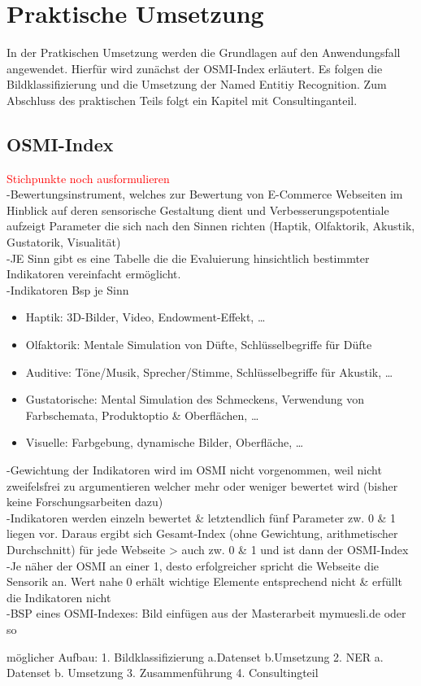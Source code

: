 \newpage
\section{Praktische Umsetzung} \label{latexDetails}

In der Pratkischen Umsetzung werden die Grundlagen auf den Anwendungsfall angewendet. Hierfür wird zunächst der OSMI-Index erläutert.
Es folgen die Bildklassifizierung und die Umsetzung der Named Entitiy Recognition. Zum Abschluss des praktischen Teils folgt ein Kapitel
mit Consultinganteil.

\subsection{OSMI-Index}

\textcolor{red}{Stichpunkte noch ausformulieren} \\

-Bewertungsinstrument, welches zur Bewertung von E-Commerce Webseiten im Hinblick auf
deren sensorische Gestaltung dient und Verbesserungspotentiale aufzeigt
Parameter die sich nach den Sinnen richten (Haptik, Olfaktorik, Akustik, Gustatorik,
Visualität) \\
-JE Sinn gibt es eine Tabelle die die Evaluierung hinsichtlich bestimmter Indikatoren
vereinfacht ermöglicht. \\
-Indikatoren Bsp je Sinn\\
\begin{itemize}
	\item Haptik: 3D-Bilder, Video, Endowment-Effekt, …
	\item Olfaktorik: Mentale Simulation von Düfte, Schlüsselbegriffe für Düfte
	\item Auditive: Töne/Musik, Sprecher/Stimme, Schlüsselbegriffe für Akustik, …
	\item Gustatorische: Mental Simulation des Schmeckens, Verwendung von
	Farbschemata, Produktoptio \& Oberflächen, …
	\item Visuelle: Farbgebung, dynamische Bilder, Oberfläche, …
\end{itemize}

-Gewichtung der Indikatoren wird im OSMI nicht vorgenommen, weil nicht zweifelsfrei zu
argumentieren welcher mehr oder weniger bewertet wird (bisher keine Forschungsarbeiten
dazu) \\
-Indikatoren werden einzeln bewertet \& letztendlich fünf Parameter zw. 0 \& 1 liegen vor.
Daraus ergibt sich Gesamt-Index (ohne Gewichtung, arithmetischer Durchschnitt) für jede
Webseite > auch zw. 0 \& 1 und ist dann der OSMI-Index \\
-Je näher der OSMI an einer 1, desto erfolgreicher spricht die Webseite die Sensorik an. Wert
nahe 0 erhält wichtige Elemente entsprechend nicht \& erfüllt die Indikatoren nicht \\
-BSP eines OSMI-Indexes: Bild einfügen aus der Masterarbeit mymuesli.de oder so



möglicher Aufbau:
1.	Bildklassifizierung
	a.Datenset
	b.Umsetzung
2.	NER
	a.	Datenset
	b.	Umsetzung
3.	Zusammenführung
4.	Consultingteil
